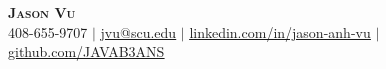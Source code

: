 \begin{center}
    \textbf{\Huge \scshape Jason Vu} \\ \vspace{1pt}
    \small 408-655-9707 $|$ \href{mailto:jvu@scu.edu}{\underline{jvu@scu.edu}} $|$ 
    \href{https://linkedin.com/in/jason-anh-vu}{\underline{linkedin.com/in/jason-anh-vu}} $|$
    \href{https://github.com/javab3ans}{\underline{github.com/JAVAB3ANS}} 
\end{center} 